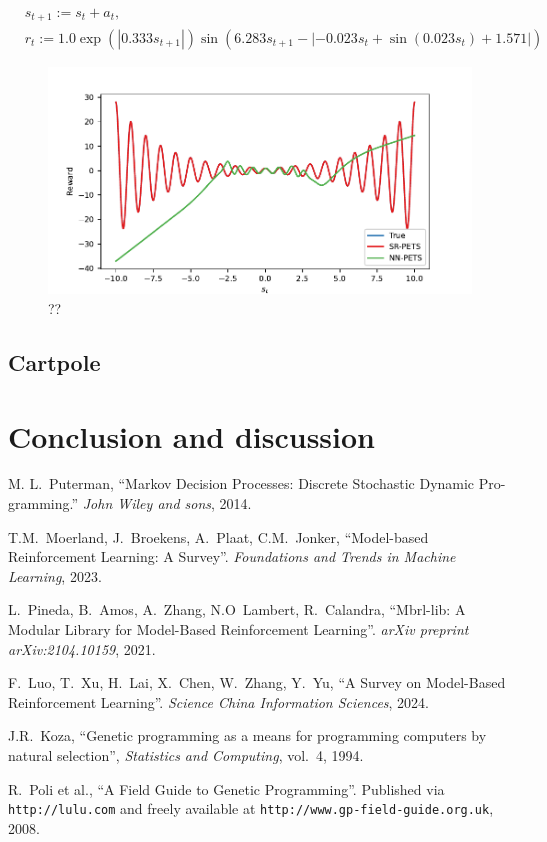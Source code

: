 \documentclass[11pt]{article}
\begin{document}
\begin{align}
	&s_{t+1} := s_t + a_t,\\
	&r_t := 1.0\exp(|0.333s_{t+1}|)\sin(6.283s_{t+1} - |-0.023 s_t + \sin(0.023 s_t) + 1.571|)
\end{align}


\begin{figure}
	\centering
	\includegraphics{simple1dmdp_pets.pdf}
	\caption{??}
	\label{fig: simple_1dmdp}
\end{figure}

\subsection{Cartpole}


\section{Conclusion and discussion}



\begin{thebibliography}{10}
	M. L.~Puterman, ``Markov Decision Processes: Discrete Stochastic Dynamic Pro-
	gramming.'' {\em John Wiley and sons}, 2014.
	
	T.M.~Moerland, J.~Broekens, A.~Plaat, C.M.~Jonker, ``Model-based Reinforcement Learning: A Survey''. {\em Foundations and Trends in Machine Learning}, 2023.
	
	L.~Pineda, B.~Amos, A.~Zhang, N.O~Lambert, R.~Calandra, ``Mbrl-lib: A Modular Library for Model-Based Reinforcement Learning''. {\em arXiv preprint arXiv:2104.10159}, 2021.
	
	F.~Luo, T.~Xu, H.~Lai, X.~Chen, W.~Zhang, Y.~Yu, ``A Survey on Model-Based Reinforcement Learning''. {\em Science China Information Sciences}, 2024.
	
	J.R.~Koza, ``Genetic programming as a means for programming computers by natural selection'', 
	{\em Statistics and Computing}, vol.~4, 1994.
	
	R.~Poli et al., ``A Field Guide to Genetic Programming''.
	\newblock Published via \texttt{http://lulu.com} and freely available at \texttt{http://www.gp-field-guide.org.uk}, 2008.
	
\end{thebibliography}
\end{document}
